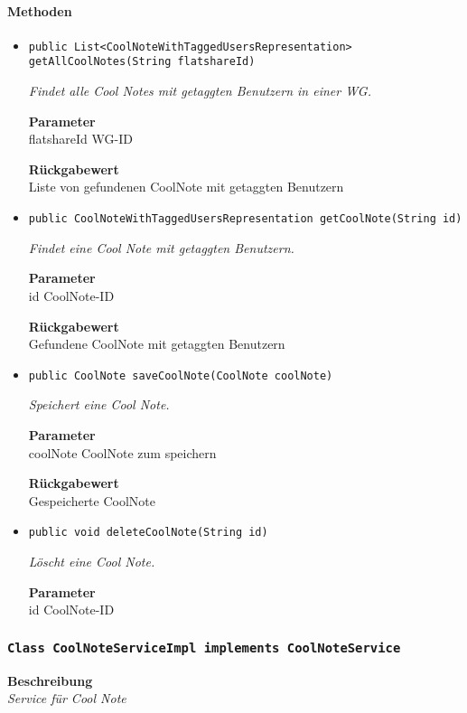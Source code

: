     \paragraph*{Methoden}
    \begin{itemize}
    	\item{\texttt{public List<CoolNoteWithTaggedUsersRepresentation> getAllCoolNotes(String flatshareId)}}
    	
    	\textit{Findet alle Cool Notes mit getaggten Benutzern in einer WG.}
    	
    	\textbf{Parameter} \\
    	flatshareId WG-ID
    	
    	\textbf{Rückgabewert} \\
    	Liste von gefundenen CoolNote mit getaggten Benutzern        \item{\texttt{public CoolNoteWithTaggedUsersRepresentation getCoolNote(String id)}}
    	
    	\textit{Findet eine Cool Note mit getaggten Benutzern.}
    	
    	\textbf{Parameter} \\
    	id CoolNote-ID
    	
    	\textbf{Rückgabewert} \\
    	Gefundene CoolNote mit getaggten Benutzern        \item{\texttt{public CoolNote saveCoolNote(CoolNote coolNote)}}
    	
    	\textit{Speichert eine Cool Note.}
    	
    	\textbf{Parameter} \\
    	coolNote CoolNote zum speichern
    	
    	\textbf{Rückgabewert} \\
    	Gespeicherte CoolNote        \item{\texttt{public void deleteCoolNote(String id)}}
    	
    	\textit{Löscht eine Cool Note.}
    	
    	\textbf{Parameter} \\
    	id CoolNote-ID
    	
    	
    \end{itemize}
    \subsubsection{\texttt{Class CoolNoteServiceImpl implements CoolNoteService}}
    \textbf{Beschreibung} \\
    \textit{Service für Cool Note}
